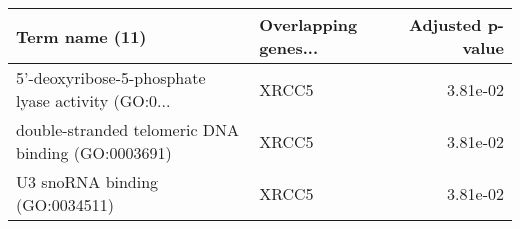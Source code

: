 \begin{tabular}{llr}
\toprule
                                    Term name (11) & Overlapping genes... &  Adjusted p-value \\
\midrule
5'-deoxyribose-5-phosphate lyase activity (GO:0... &                XRCC5 &          3.81e-02 \\
double-stranded telomeric DNA binding (GO:0003691) &                XRCC5 &          3.81e-02 \\
                    U3 snoRNA binding (GO:0034511) &                XRCC5 &          3.81e-02 \\
\bottomrule
\end{tabular}

